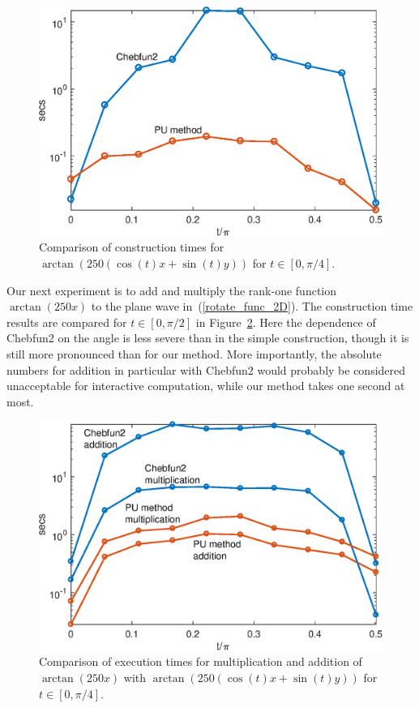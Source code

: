 \begin{figure}
\centering
\includegraphics[scale = 0.5]{Chapter2/tan_rotate_2D}
\caption{Comparison of construction times for $\arctan(250(\cos(t)x+\sin(t)y))$ for $t \in [0,\pi/4]$.}
\label{tan_rotate_2D}
\end{figure}


Our next experiment is to add and multiply the rank-one function $\arctan(250x)$ to the plane wave in~(\ref{rotate_func_2D}). The construction time results are compared for $t \in [0,\pi/2]$ in Figure~\ref{TAN_ADD_MULT}. Here the dependence of Chebfun2 on the angle is less severe than in the simple construction, though it is still more pronounced than for our method. More importantly, the absolute numbers for addition in particular with Chebfun2 would probably be considered unacceptable for interactive computation, while our method takes one second at most. 

\begin{figure}
\centering
\includegraphics[scale = 0.5]{Chapter2/tan_rotate_add_mult_2D}
\caption{Comparison of execution times for multiplication and addition of $\arctan(250x)$ with $\arctan(250(\cos(t)x+\sin(t)y))$ for $t \in [0,\pi/4]$.}
\label{TAN_ADD_MULT}
\end{figure}



